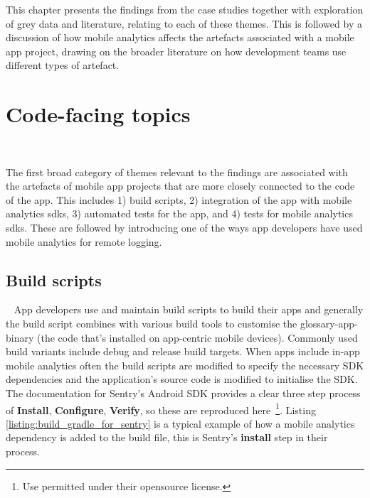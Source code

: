This chapter presents the findings from the case studies together with exploration of grey data and literature, relating to each of these themes. This is followed by a discussion of how mobile analytics affects the artefacts associated with a mobile app project, drawing on the broader literature on how development teams use different types of artefact.



\section{Code-facing topics}~\label{aata-code-facing-topics}

The first broad category of themes relevant to the findings are associated with the artefacts of mobile app projects that are more closely connected to the code of the app. This includes 1) build scripts, 2) integration of the app with mobile analytics \Gls{sdk}s, 3) automated tests for the app, and 4) tests for mobile analytics \Gls{sdk}s. These are followed by introducing one of the ways app developers have used mobile analytics for remote logging.

\subsection{Build scripts}~\label{aata-build-scripts}
App developers use and maintain build scripts to build their apps and generally the build script combines with various build tools to customise the \gls{glossary-app-binary} (the code that's installed on app-centric mobile devices). Commonly used build variants include debug and release build targets. 
When apps include in-app mobile analytics often the build scripts are modified to specify the necessary SDK dependencies and the application's source code is modified to initialise the SDK. The documentation for Sentry's Android SDK provides a clear three step process of \textbf{Install}, \textbf{Configure}, \textbf{Verify}, so these are reproduced here~\footnote{Use permitted under their opensource license.}. Listing \ref{listing:build_gradle_for_sentry} is a typical example of how a mobile analytics dependency is added to the build file, this is Sentry's \textbf{install} step in their process.

